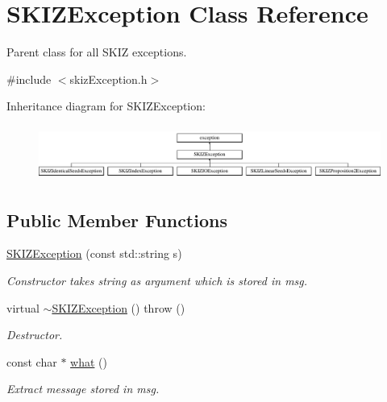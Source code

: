\hypertarget{classSKIZException}{}\section{S\+K\+I\+Z\+Exception Class Reference}
\label{classSKIZException}


Parent class for all S\+K\+IZ exceptions.  




{\ttfamily \#include $<$skiz\+Exception.\+h$>$}

Inheritance diagram for S\+K\+I\+Z\+Exception\+:\begin{figure}[H]
\begin{center}
\leavevmode
\includegraphics[height=1.816216cm]{classSKIZException}
\end{center}
\end{figure}
\subsection*{Public Member Functions}
\begin{DoxyCompactItemize}
\item 
\mbox{\label{classSKIZException_a30a47c59e9fd4ea93441c9029c4068d9}} 
\mbox{\hyperlink{classSKIZException_a30a47c59e9fd4ea93441c9029c4068d9}{S\+K\+I\+Z\+Exception}} (const std\+::string s)
\begin{DoxyCompactList}\small\item\em Constructor takes string as argument which is stored in msg. \end{DoxyCompactList}\item 
\mbox{\label{classSKIZException_ac1b8f1ba8ae87ce018c645a1a67b6d34}} 
virtual \mbox{\hyperlink{classSKIZException_ac1b8f1ba8ae87ce018c645a1a67b6d34}{$\sim$\+S\+K\+I\+Z\+Exception}} ()  throw ()
\begin{DoxyCompactList}\small\item\em Destructor. \end{DoxyCompactList}\item 
\mbox{\label{classSKIZException_a55c36f650f02f283215679ad070dd54b}} 
const char $\ast$ \mbox{\hyperlink{classSKIZException_a55c36f650f02f283215679ad070dd54b}{what}} ()
\begin{DoxyCompactList}\small\item\em Extract message stored in msg. \end{DoxyCompactList}\end{DoxyCompactItemize}


